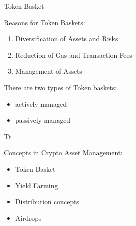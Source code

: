 \documentclass[handout]{beamer}
\begin{document}
\begin{frame}{Token Basket}

Reasons for Token Baskets: \\ \vspace{1em}

	\begin{enumerate}
		\item<1-> Diversification of Assets and Risks
		\item<2-> Reduction of Gas and Transaction Fees
		\item<3-> Management of Assets
	\end{enumerate}
	
\vspace{1em}

There are two types of Token baskets: \vspace{1em}
	
	\begin{itemize}
		\item<4-> actively managed
		\item<5-> passively managed
	\end{itemize}
	

\end{frame}


\begin{frame}{Tt}

Concepts in Crypto Asset Management: \\ \vspace{1em}
	
	\begin{itemize}
		\item<1-> Token Basket 
		\item<2-> Yield Farming
		\item<3-> Distribution concepts
		\item<4-> Airdrops
	\end{itemize}

\end{frame}
\end{document}
